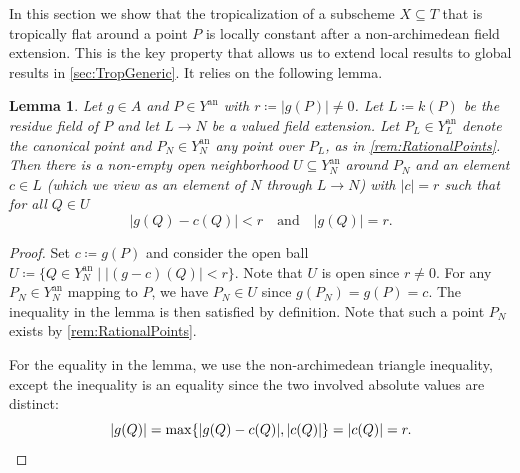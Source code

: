\documentclass[12pt,reqno,a4paper]{amsart}
\theoremstyle{theoremstyle}
\newtheorem{lemma}[theorem]{Lemma}
\theoremstyle{examplestyle}
\theoremstyle{algorithmstyle}
\begin{document}
In this section we show that the tropicalization of a subscheme $X\subseteq T$ that is tropically flat around a point $P$ is locally constant after a non-archimedean field extension. This is the key property that allows us to extend local results to global results in \cref{sec:TropGeneric}. It relies on the following lemma.

\begin{lemma}\label{lem:ApproximationLemma}
  Let $g\in{A}$ and $P\in{Y^{\mathrm{an}}}$ with $r\coloneqq |g(P)|\neq{0}$. Let $L\coloneqq k(P)$ be the residue field of $P$ and let $L\to  N$ be a valued field extension. Let $P_{L}\in Y^{\mathrm{an}}_{L}$ denote the canonical point and $P_{N}\in Y^{\mathrm{an}}_{N}$ any point over $P_{L}$, as in \cref{rem:RationalPoints}.
  Then there is a non-empty open neighborhood $U\subseteq Y^{\mathrm{an}}_{N}$ around $P_{N}$ and an element $c\in{L}$ (which we view as an element of $N$ through $L\to N$) with $|c|=r$ such that for all $Q\in U$
  \begin{equation}
    \label{eq:ApproximationLemma}
    |g(Q)-c(Q)|<r \quad\text{and}\quad |g(Q)|=r.
  \end{equation}
\end{lemma}
\begin{proof}
  Set $c\coloneqq g(P)$ and consider the open ball $U\coloneqq\{Q\in{Y_{N}^{\mathrm{an}}}\mid |(g-c)(Q)|<r\}$. Note that $U$ is open since $r\neq{0}$. For any $P_{N}\in{Y_{N}^{\mathrm{an}}}$ mapping to $P$, we have $P_{N}\in{U}$ since $g(P_{N})=g(P)=c$.
  The inequality in the lemma is then satisfied by definition. Note that such a point $P_{N}$ exists by \cref{rem:RationalPoints}.

  For the equality in the lemma, we use the non-archimedean triangle inequality, except the inequality is an equality since the two involved absolute values are distinct:
  \begin{equation*}
    |g(Q)|= \max\{|g(Q)-c(Q)|,|c(Q)|\}=|c(Q)|=r. \qedhere
  \end{equation*}
\end{proof}
%


\vspace{0.2cm}
\end{document}
